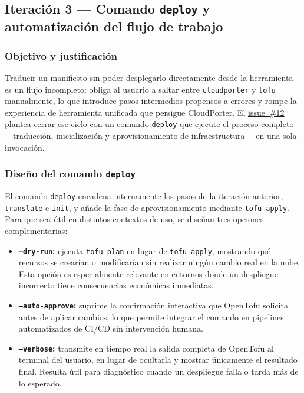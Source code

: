 \subsection{Iteración 3 — Comando \texttt{deploy} y automatización del flujo de trabajo}
\label{sec:iter3}

\subsubsection{Objetivo y justificación}

Traducir un manifiesto sin poder desplegarlo directamente desde la herramienta es un flujo
incompleto: obliga al usuario a saltar entre \texttt{cloudporter} y \texttt{tofu} manualmente, lo
que introduce pasos intermedios propensos a errores y rompe la experiencia de herramienta
unificada que persigue CloudPorter. El \href{https://github.com/lucpez/cloudporter/issues/12}{issue~\#12} plantea cerrar ese ciclo con un comando
\texttt{deploy} que ejecute el proceso completo —traducción, inicialización y aprovisionamiento
de infraestructura— en una sola invocación.

\subsubsection{Diseño del comando \texttt{deploy}}

El comando \texttt{deploy} encadena internamente los pasos de la iteración anterior,
\texttt{translate} e \texttt{init}, y añade la fase de aprovisionamiento mediante
\texttt{tofu apply}. Para que sea útil en distintos contextos de uso, se diseñan tres
opciones complementarias:

\begin{itemize}
    \item \textbf{\texttt{--dry-run}:} ejecuta \texttt{tofu plan} en lugar de
    \texttt{tofu apply}, mostrando qué recursos se crearían o modificarían sin realizar
    ningún cambio real en la nube. Esta opción es especialmente relevante en entornos donde
    un despliegue incorrecto tiene consecuencias económicas inmediatas.
    \item \textbf{\texttt{--auto-approve}:} suprime la confirmación interactiva que
    OpenTofu solicita antes de aplicar cambios, lo que permite integrar el comando en
    pipelines automatizados de CI/CD sin intervención humana.
    \item \textbf{\texttt{--verbose}:} transmite en tiempo real la salida completa de
    OpenTofu al terminal del usuario, en lugar de ocultarla y mostrar únicamente el resultado
    final. Resulta útil para diagnóstico cuando un despliegue falla o tarda más de lo esperado.
\end{itemize}

